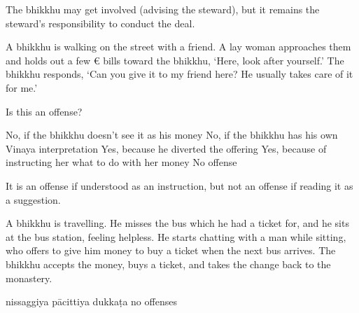 \begin{exam}{\autoExamName}
\begin{problem*}
\begin{parts}
      \begin{solution}
        The bhikkhu may get involved (advising the steward), but it remains the
        steward's responsibility to conduct the deal.
      \end{solution}

    \end{parts}

  \end{problem*}

  \problemDivide

  \begin{problem}

    A bhikkhu is walking on the street with a friend. A lay woman approaches
    them and holds out a few € bills toward the bhikkhu, `Here, look after
    yourself.' The bhikkhu responds, `Can you give it to my friend here? He
    usually takes care of it for me.'

    \bigskip

    Is this an offense?

    \bigskip

    \begin{answers}{1}
      \bChoices
       No, if the bhikkhu doesn't see it as his money\eAns
       No, if the bhikkhu has his own Vinaya interpretation\eAns
       Yes, because he diverted the offering\eAns
       Yes, because of instructing her what to do with her money\eAns
       No offense\eAns
      \eChoices
    \end{answers}

    \begin{solution}
      It is an offense if understood as an instruction, but not an offense if
      reading it as a suggestion.
    \end{solution}

  \end{problem}

  \problemDivide

  \begin{problem}
    A bhikkhu is travelling. He misses the bus which he had a ticket for, and he
    sits at the bus station, feeling helpless. He starts chatting with a man
    while sitting, who offers to give him money to buy a ticket when the next
    bus arrives. The bhikkhu accepts the money, buys a ticket, and takes the
    change back to the monastery.
  \end{problem}

  \bigskip

    \begin{answers}{3}
      \bChoices
       nissaggiya pācittiya\eAns
       dukkaṭa\eAns
       no offenses\eAns
      \eChoices
    \end{answers}


\end{exam}
